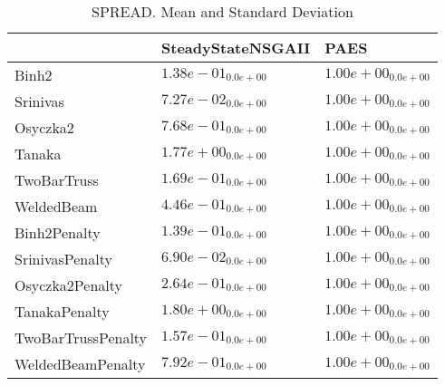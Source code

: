 \documentclass{article}
\begin{document}
\begin{table}
\caption{SPREAD. Mean and Standard Deviation}
\label{table: SPREAD}
\centering
\begin{scriptsize}
\begin{tabular}{lll}
\hline & SteadyStateNSGAII &  PAES\\
\hline 
Binh2 & \cellcolor{gray95}$  1.38e-01_{ 0.0e+00}$ & \cellcolor{gray25}$  1.00e+00_{ 0.0e+00}$ \\
Srinivas & \cellcolor{gray95}$  7.27e-02_{ 0.0e+00}$ & \cellcolor{gray25}$  1.00e+00_{ 0.0e+00}$ \\
Osyczka2 & \cellcolor{gray95}$  7.68e-01_{ 0.0e+00}$ & \cellcolor{gray25}$  1.00e+00_{ 0.0e+00}$ \\
Tanaka & \cellcolor{gray25}$  1.77e+00_{ 0.0e+00}$ & \cellcolor{gray95}$  1.00e+00_{ 0.0e+00}$ \\
TwoBarTruss & \cellcolor{gray95}$  1.69e-01_{ 0.0e+00}$ & \cellcolor{gray25}$  1.00e+00_{ 0.0e+00}$ \\
WeldedBeam & \cellcolor{gray95}$  4.46e-01_{ 0.0e+00}$ & \cellcolor{gray25}$  1.00e+00_{ 0.0e+00}$ \\
Binh2Penalty & \cellcolor{gray95}$  1.39e-01_{ 0.0e+00}$ & \cellcolor{gray25}$  1.00e+00_{ 0.0e+00}$ \\
SrinivasPenalty & \cellcolor{gray95}$  6.90e-02_{ 0.0e+00}$ & \cellcolor{gray25}$  1.00e+00_{ 0.0e+00}$ \\
Osyczka2Penalty & \cellcolor{gray95}$  2.64e-01_{ 0.0e+00}$ & \cellcolor{gray25}$  1.00e+00_{ 0.0e+00}$ \\
TanakaPenalty & \cellcolor{gray25}$  1.80e+00_{ 0.0e+00}$ & \cellcolor{gray95}$  1.00e+00_{ 0.0e+00}$ \\
TwoBarTrussPenalty & \cellcolor{gray95}$  1.57e-01_{ 0.0e+00}$ & \cellcolor{gray25}$  1.00e+00_{ 0.0e+00}$ \\
WeldedBeamPenalty & \cellcolor{gray95}$  7.92e-01_{ 0.0e+00}$ & \cellcolor{gray25}$  1.00e+00_{ 0.0e+00}$ \\
\hline
\end{tabular}
\end{scriptsize}
\end{table}
\end{document}
